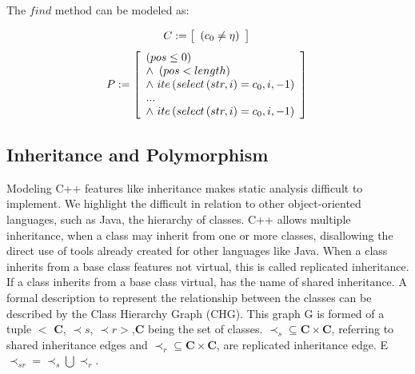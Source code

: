 \documentclass[a4paper]{llncs}
\begin{document}
The $find$ method can be modeled as:

\begin{equation}
\label{cfind-string}
C := \left [ \begin{array}{ll} 
                \left(c_{0} \neq \eta\right)\\
              \end{array} \right ]  \\ 
\end{equation}
%
\begin{equation}
\label{pfind-string}
P := \left [ \begin{array}{ll} 
	       \left(pos \leq 0\right)\\
               \wedge \, \, \left(pos < length\right)\\
               \wedge \, \, ite\left(select\left(str, i\right) = c_{0}, i, -1\right)\\
	       ...\\
	       \wedge \, \, ite\left(select\left(str, i\right) = c_{0}, i, -1\right)\\
              \end{array} \right ]  \\ 
\end{equation}

\subsection{Inheritance and Polymorphism}

Modeling C++ features like inheritance makes static analysis difficult to implement. We highlight the difficult in relation to other 
object-oriented languages, such as Java, the hierarchy of classes. C++ allows multiple inheritance, when a class may inherit from 
one or more classes, disallowing the direct use of tools already created for other languages like Java.
When a class inherits from a base class features not virtual, this is called replicated inheritance. If a class inherits from a base 
class virtual, has the name of shared inheritance.
A formal description to represent the relationship between the classes can be described by the Class Hierarchy Graph (CHG). 
This graph G is formed of a tuple $<$ \textbf{C},  $\prec s$, $\prec r >$,\textbf{C} being the set of classes. $ 
\prec_s \subseteq \textbf{C} \times \textbf{C}$, referring to shared inheritance edges and $\prec_r \subseteq 
\textbf{C} \times \textbf{C}$, are replicated inheritance edge. E $\prec_{sr} = \prec_s \bigcup \prec_r$.
\end{document}
